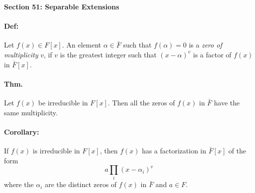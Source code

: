 \documentclass[10pt,a4paper]{article}
\begin{document}
\begin{center}
\textbf{Section 51: Separable Extensions}
\end{center}

\paragraph{Def:} Let $f(x) \in F[x]$. An element $\alpha \in \bar{F}$ such that $f(\alpha) = 0$ is a \textit{zero of multiplicity} $v$, if $v$ is the greatest integer such that $(x-\alpha)^v$ is a factor of $f(x)$ in $\bar{F}[x]$.

\paragraph{Thm.} Let $f(x)$ be irreducible in $F[x]$. Then all the zeros of $f(x)$ in $\bar{F}$ have the same multiplicity.

\paragraph{Corollary:} If $f(x)$ is irreducible in $F[x]$, then $f(x)$ has a factorization in $\bar{F}[x]$ of the form
$$ a\prod_i (x-\alpha_i)^v$$
where the $\alpha_i$ are the distinct zeros of $f(x)$ in $\bar{F}$ and $a \in F$.
\end{document}
